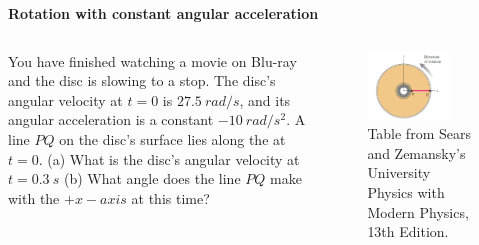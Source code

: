 \documentclass[]{beamer}
\begin{document}

\begin{frame}
    \textbf{Rotation with constant angular acceleration}   
    \vspace{5mm}


    

      
      


      
   \begin{columns}[c]
    \column{2in}  %
   


    You have finished watching a movie on Blu-ray and the disc is
    slowing to a stop. The disc’s angular velocity at $t=0$ is $27.5~rad/s$,
    and its angular acceleration is a constant $-10~rad/s^2$. A line $PQ$
    on the disc’s surface lies along the at $t=0$.
    (a) What is the disc’s angular velocity at $t=0.3~s$ (b) What
    angle does the line $PQ$ make with the $+x-axis$ at this time?
    



    \column{2in}
 

    \begin{figure}[h!]  
        \includegraphics[width=0.8\textwidth]{images/18.jpg}
        \caption{ {\tiny Table from Sears and Zemansky's University Physics 
        with Modern Physics, 13th Edition.} }
        \label{disc}
      \end{figure}


    \end{columns}





    \end{frame}
\end{document}
